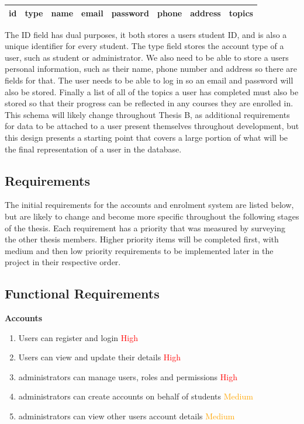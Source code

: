 \begin{center}
    \begin{tabular}{|c|c|c|c|c|c|c|c|} 
        \hline
        id & type & name & email & password & phone & address & topics \\ [0.5ex] 
        \hline
    \end{tabular}
\end{center}

The ID field has dual purposes, it both stores a users student ID, and is also a unique identifier for every student. The type field stores the account type of a user, such as student or administrator. We also need to be able to store a users personal information, such as their name, phone number and address so there are fields for that. The user needs to be able to log in so an email and password will also be stored. Finally a list of all of the topics a user has completed must also be stored so that their progress can be reflected in any courses they are enrolled in.\\

This schema will likely change throughout Thesis B, as additional requirements for data to be attached to a user present themselves throughout development, but this design presents a starting point that covers a large portion of what will be the final representation of a user in the database.

\subsection{Requirements}
The initial requirements for the accounts and enrolment system are listed below, but are likely to change and become more specific throughout the following stages of the thesis. Each requirement has a priority that was measured by surveying the other thesis members. Higher priority items will be completed first, with medium and then low priority requirements to be implemented later in the project in their respective order.

\subsection{Functional Requirements}
\textbf{Accounts}
    \begin{enumerate}
    \item Users can register and login \textcolor{Red}{High}
    \item Users can view and update their details \textcolor{Red}{High}
    \item administrators can manage users, roles and permissions \textcolor{Red}{High}
    \item administrators can create accounts on behalf of students \textcolor{Orange}{Medium}
    \item administrators can view other users account details \textcolor{Orange}{Medium}
    \end{enumerate}

